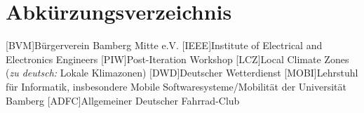\chapter*{Abkürzungsverzeichnis}

\begin{acronym}
    [BVM]{Bürgerverein Bamberg Mitte e.V.}
    [IEEE]{Institute of Electrical and Electronics Engineers}
    [PIW]{Post-Iteration Workshop}
    [LCZ]{Local Climate Zones (\textit{zu deutsch:} Lokale Klimazonen)}
    [DWD]{Deutscher Wetterdienst}
    [MOBI]{Lehrstuhl für Informatik, insbesondere Mobile Softwaresysteme/Mobilität der Universität Bamberg}
    [ADFC]{Allgemeiner Deutscher Fahrrad-Club}
\end{acronym}
